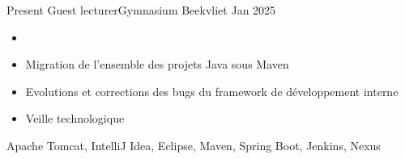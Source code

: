 %
%
%

\begin{experiences}
  \experience
        {Present}  {Guest lecturer}{Gymnasium Beekvliet}
        {Jan 2025} {
                    \begin{itemize}
                        \item 
                        \item Migration de l'ensemble des projets Java sous Maven
                        \item Evolutions et corrections des bugs du framework de développement interne
                        \item Veille technologique
                    \end{itemize}
                    }
                    {Apache Tomcat, IntelliJ Idea, Eclipse, Maven, Spring Boot, Jenkins, Nexus}
  \emptySeparator

\end{experiences}
